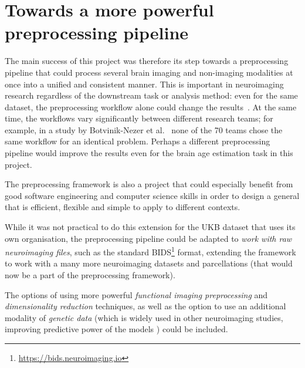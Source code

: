 
\section{Towards a more powerful preprocessing pipeline}
The main success of this project was therefore its step towards a preprocessing pipeline that could process several brain imaging and non-imaging modalities at once into a unified and consistent manner. This is important in neuroimaging research regardless of the downstream task or analysis method: even for the same dataset, the preprocessing workflow alone could change the results~\cite{salehi2020there}. At the same time, the workflows vary significantly between different research teams; for example, in a study by Botvinik-Nezer et al.~\cite{botvinik2019variability} none of the 70 teams chose the same workflow for an identical problem. Perhaps a different preprocessing pipeline would improve the results even for the brain age estimation task in this project.

The preprocessing framework is also a project that could especially benefit from good software engineering and computer science skills in order to design a general that is efficient, flexible and simple to apply to different contexts.

While it was not practical to do this extension for the UKB dataset that uses its own organisation, the preprocessing pipeline could be adapted to \textit{work with raw neuroimaging files}, such as the standard BIDS\footnote{\url{https://bids.neuroimaging.io}} format, extending the framework to work with a many more neuroimaging datasets and parcellations (that would now be a part of the preprocessing framework).

The options of using more powerful \textit{functional imaging preprocessing} and \textit{dimensionality reduction} techniques, as well as the option to use an additional modality of \textit{genetic data} (which is widely used in other neuroimaging studies, improving predictive power of the models \cite{cole2018brain,parisot2018disease}) could be included.


